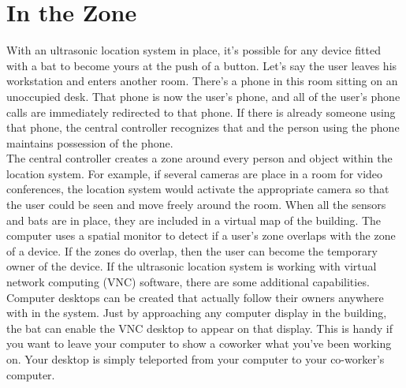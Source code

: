 \documentclass[12pt]{report}
\begin{document}
\section{In the Zone}
\hspace*{0.5in}With an ultrasonic location system in place, it's possible for any device fitted with a bat to become yours at the push of a button. Let's say the user leaves his workstation and enters another room. There's a phone in this room sitting on an unoccupied desk. That phone is now the user's phone, and all of the user's phone calls are immediately redirected to that phone. If there is already someone using that phone, the central controller recognizes that and the person using the phone maintains possession of the phone.
\\\hspace*{0.5in}The central controller creates a zone around every person and object within the location system. For example, if several cameras are place in a room for video conferences, the location system would activate the appropriate camera so that the user could be seen and move freely around the room. When all the sensors and bats are in place, they are included in a virtual map of the building. The computer uses a spatial monitor to detect if a user's zone overlaps with the zone of a device. If the zones do overlap, then the user can become the temporary owner of the device. If the ultrasonic location system is working with virtual network computing (VNC) software, there are some additional capabilities. Computer desktops can be created that actually follow their owners anywhere with in the system. Just by approaching any computer display in the building, the bat can enable the VNC desktop to appear on that display. This is handy if you want to leave your computer to show a coworker what you've been working on. Your desktop is simply teleported from your computer to your co-worker's computer.
\end{document}
